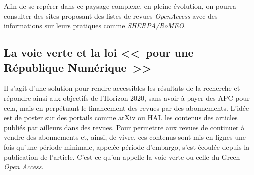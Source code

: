 Afin de se rep{\'e}rer dans ce paysage complexe, en pleine {\'e}volution, on pourra consulter des sites proposant des listes de revues \emph{OpenAccess}
avec des informations sur leurs pratiques comme \href{http://www.sherpa.ac.uk/romeo/index.php}{\emph{SHERPA/RoMEO}}.

\subsection{La voie verte et la loi <<~pour une R{\'e}publique Num{\'e}rique~>>}

Il s'agit d'une solution pour rendre accessibles les r{\'e}sultats de la recherche et r{\'e}pondre ainsi aux objectifs de l'Horizon 2020, sans avoir {\`a}
payer des APC pour cela, mais en perp{\'e}tuant le financement des revues par des abonnements. L'id{\'e}e est de poster sur des portails comme arXiv ou
HAL les contenus des articles publi{\'e}s par ailleurs dans des revues. Pour permettre aux revues de continuer {\`a} vendre des abonnements et, ainsi,
de vivre, ces contenus sont mis en lignes une fois qu'une p{\'e}riode minimale, appel{\'e}e p{\'e}riode d'embargo, s'est {\'e}coul{\'e}e depuis la publication de l'article.
C'est ce qu'on appelle la voie verte ou celle du Green \emph{Open Access}.

